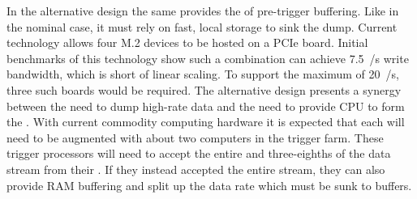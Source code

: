 In the alternative design the same  provides the
\snbpretime of pre-trigger  buffering. 
Like in the nominal case, it must rely on fast, local 
storage to sink the dump. 
Current  technology allows four M.2  devices to
be hosted on a PCIe board. 
Initial benchmarks of this technology show such a combination can
achieve \SI{7.5}{\GB/\s} write bandwidth, which is short of linear
scaling. 
To support the maximum of \SI{20}{\GB/\s}, three such boards would be
required.
The alternative design presents a synergy between the need to dump
high-rate data and the need to provide CPU to form the
. 
With current commodity computing hardware it is expected that each
 will need to be augmented with about two computers in the trigger
farm. 
These trigger processors will need to accept the entire \dual and
three-eighths of the \single data stream from their . 
If they instead accepted the entire stream, they can also provide
RAM buffering and split up the data rate which must be sunk to
 buffers.


